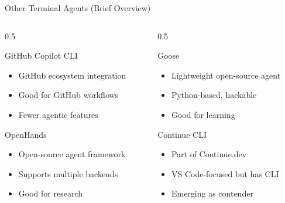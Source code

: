 \documentclass[aspectratio=169,11pt]{beamer}
\begin{document}
\begin{frame}{Other Terminal Agents (Brief Overview)}
    \begin{columns}[T]
        \begin{column}{0.5\textwidth}
            \begin{block}{GitHub Copilot CLI}
                \begin{itemize}
                    \item GitHub ecosystem integration
                    \item Good for GitHub workflows
                    \item Fewer agentic features
                \end{itemize}
            \end{block}

            \begin{block}{OpenHands}
                \begin{itemize}
                    \item Open-source agent framework
                    \item Supports multiple backends
                    \item Good for research
                \end{itemize}
            \end{block}
        \end{column}
        \begin{column}{0.5\textwidth}
            \begin{block}{Goose}
                \begin{itemize}
                    \item Lightweight open-source agent
                    \item Python-based, hackable
                    \item Good for learning
                \end{itemize}
            \end{block}

            \begin{block}{Continue CLI}
                \begin{itemize}
                    \item Part of Continue.dev
                    \item VS Code-focused but has CLI
                    \item Emerging as contender
                \end{itemize}
            \end{block}
        \end{column}
    \end{columns}


\end{frame}
\end{document}
